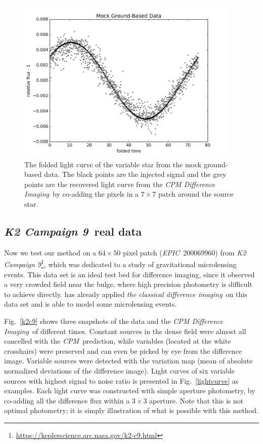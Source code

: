 \documentclass[12pt, preprint]{aastex}
\newcommand{\project}[1]{\textsl{#1}}
\newcommand{\cpm}{\project{CPM}}
\newcommand{\cpmdiff}{\project{CPM Difference Imaging}}
\newcommand{\class}{\project{the classical difference imaging}}
\newcommand{\KTCN}{\project{K2 Campaign 9}}
\newcommand{\epic}{\project{EPIC}}
\begin{document}
\begin{figure}[p]
\begin{center}
\includegraphics[width=0.95\textwidth]{f4a}
\end{center}
\caption{
\label{ground_lc}
 The folded light curve of the variable star from the mock ground-based data.
 The black points are the injected signal and the grey points are the recovered light curve from the \cpmdiff\ by co-adding the pixels in a $7\times 7$ patch around the source star.
}
\end{figure}

\subsection{\KTCN\ real data}
Now we test our method on a $64\times50$ pixel patch (\epic\ 200069960) from \KTCN\footnote{\url{https://keplerscience.arc.nasa.gov/k2-c9.html}}\citep{k2c9}, which was dedicated to a study of gravitational microlensing events.
This data set is an ideal test bed for difference imaging, since it observed a very crowded field near the bulge, where high precision photometry is difficult to achieve directly.
\cite{wei} has already applied \class\ on this data set and is able to model some microlensing events.

Fig.~\ref{k2c9} shows three snapshots of the data and the \cpmdiff\ of different times.
Constant sources in the dense field were almost all cancelled with the \cpm\ prediction, while variables (located at the white crosshairs) were preserved and can even be picked by eye from the difference image.
Variable sources were detected with the variation map (mean of absolute normalized deviations of the difference image). 
Light curves of six variable sources with highest signal to noise ratio is presented in Fig.~\ref{lightcurve} as examples. 
Each light curve was constructed with simple aperture photometry, by co-adding all the difference flux within a $3 \times 3$ aperture. 
Note that this is not optimal photometry; it is simply illustration of what is possible with this method.
\end{document}
